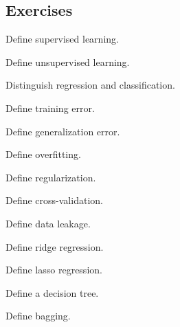 \subsection{Exercises}
\label{subsec:statistical-learning-exercises}

\begin{exercise}[1]
Define supervised learning.
\end{exercise}

\begin{exercise}[1]
Define unsupervised learning.
\end{exercise}

\begin{exercise}[1]
Distinguish regression and classification.
\end{exercise}

\begin{exercise}[1]
Define training error.
\end{exercise}

\begin{exercise}[1]
Define generalization error.
\end{exercise}

\begin{exercise}[1]
Define overfitting.
\end{exercise}

\begin{exercise}[1]
Define regularization.
\end{exercise}

\begin{exercise}[1]
Define cross-validation.
\end{exercise}

\begin{exercise}[1]
Define data leakage.
\end{exercise}

\begin{exercise}[1]
Define ridge regression.
\end{exercise}

\begin{exercise}[1]
Define lasso regression.
\end{exercise}

\begin{exercise}[1]
Define a decision tree.
\end{exercise}

\begin{exercise}[1]
Define bagging.
\end{exercise}

